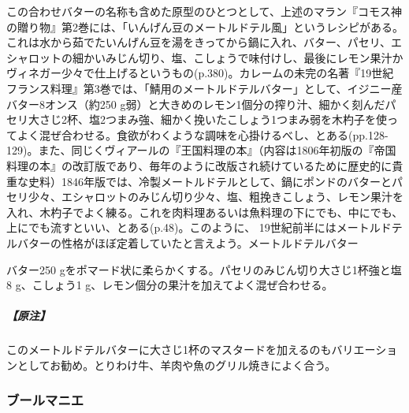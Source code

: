 \begin{recette}
{{{{  この合わせバターの名称も含めた原型のひとつとして、上述のマラン『コモス神の贈り物』第2巻には、「いんげん豆のメートルドテル風」というレシピがある。これは水から茹でたいんげん豆を湯をきってから鍋に入れ、バター、パセリ、エシャロットの細かいみじん切り、塩、こしょうで味付けし、最後にレモン果汁かヴィネガー少々で仕上げるというもの(p.380)。カレームの未完の名著『19世紀フランス料理』第3巻では、「鯖用のメートルドテルバター」として、イジニー産バター8オンス（約250
  g弱）と大きめのレモン1個分の搾り汁、細かく刻んだパセリ大さじ2杯、塩2つまみ強、細かく挽いたこしょう1つまみ弱を木杓子を使ってよく混ぜ合わせる。食欲がわくような調味を心掛けるべし、とある(pp.128-129)。また、同じくヴィアールの『王国料理の本』（内容は1806年初版の『帝国料理の本』の改訂版であり、毎年のように改版され続けているために歴史的に貴重な史料）1846年版では、冷製メートルドテルとして、鍋に\unquart{}ポンドのバターとパセリ少々、エシャロットのみじん切り少々、塩、粗挽きこしょう、レモン果汁を入れ、木杓子でよく練る。これを肉料理あるいは魚料理の下にでも、中にでも、上にでも流すといい、とある(p.48)。このように、
  19世紀前半にはメートルドテルバターの性格がほぼ定着していたと言えよう。}}{メートルドテルバター}}\label{beurre-maitre-d-hotel}}



バター250
gをポマード状に柔らかくする。パセリのみじん切り大さじ1杯強と塩8
g、こしょう1 g、レモン\unquart{}個分の果汁を加えてよく混ぜ合わせる。

\hypertarget{nota-beurre-maitre-d-hotel}{%
\subparagraph{【原注】}\label{nota-beurre-maitre-d-hotel}}

このメートルドテルバターに大さじ1杯のマスタードを加えるのもバリエーションとしてお勧め。とりわけ牛、羊肉や魚のグリル焼きによく合う。

\hypertarget{beurre-manie}{%
\subsubsection{ブールマニエ}\label{beurre-manie}}




\end{recette}
